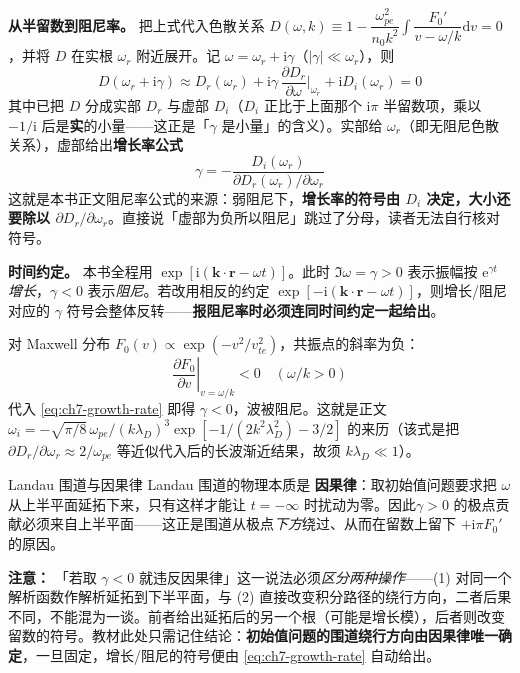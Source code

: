 \documentclass[12pt,a4paper,openany,oneside]{book}
\newcommand{\diff}{\mathrm{d}}
\newcommand{\ii}{\mathrm{i}}
\newcommand{\ee}{\mathrm{e}}
\newcommand{\vect}[1]{\bm{#1}}
\begin{document}
\textbf{从半留数到阻尼率。} 把上式代入色散关系 $D(\omega,k)\equiv 1-\dfrac{\omega_{pe}^2}{n_0k^2}\displaystyle\int\dfrac{F_0'}{v-\omega/k}\diff v=0$，并将 $D$ 在实根 $\omega_r$ 附近展开。记 $\omega=\omega_r+\ii\gamma$（$|\gamma|\ll\omega_r$），则
\[
D(\omega_r+\ii\gamma) \approx D_r(\omega_r) + \ii\gamma\,\frac{\partial D_r}{\partial\omega}\Big|_{\omega_r} + \ii D_i(\omega_r) = 0
\]
其中已把 $D$ 分成实部 $D_r$ 与虚部 $D_i$（$D_i$ 正比于上面那个 $\ii\pi$ 半留数项，乘以 $-1/\ii$ 后是\textbf{实}的小量——这正是「$\gamma$ 是小量」的含义）。实部给 $\omega_r$（即无阻尼色散关系），虚部给出\textbf{增长率公式}
\begin{equation}
\boxed{\;\gamma = -\frac{D_i(\omega_r)}{\partial D_r(\omega_r)/\partial\omega_r}\;}
\label{eq:ch7-growth-rate}
\end{equation}
这就是本书正文阻尼率公式的来源：弱阻尼下，\textbf{增长率的符号由 $D_i$ 决定，大小还要除以 $\partial D_r/\partial\omega_r$}。直接说「虚部为负所以阻尼」跳过了分母，读者无法自行核对符号。

\textbf{时间约定。} 本书全程用 $\exp[\ii(\vect{k}\cdot\vect{r}-\omega t)]$。此时 $\Im\omega=\gamma>0$ 表示振幅按 $\ee^{\gamma t}$ \emph{增长}，$\gamma<0$ 表示\emph{阻尼}。若改用相反的约定 $\exp[-\ii(\vect{k}\cdot\vect{r}-\omega t)]$，则增长/阻尼对应的 $\gamma$ 符号会整体反转——\textbf{报阻尼率时必须连同时间约定一起给出}。

对 Maxwell 分布 $F_0(v)\propto\exp(-v^2/v_{te}^2)$，共振点的斜率为负：
\begin{equation}
\left.\frac{\partial F_0}{\partial v}\right|_{v=\omega/k} < 0 \quad (\omega/k>0)
\label{eq:ch7-landau-condition}
\end{equation}
代入 \eqref{eq:ch7-growth-rate} 即得 $\gamma<0$，波被阻尼。这就是正文 $\omega_i=-\sqrt{\pi/8}\,\omega_{pe}/(k\lambda_D)^3\exp[-1/(2k^2\lambda_D^2)-3/2]$ 的来历（该式是把 $\partial D_r/\partial\omega_r\approx2/\omega_{pe}$ 等近似代入后的长波渐近结果，故须 $k\lambda_D\ll1$）。

\begin{insight}{Landau 围道与因果律}{}
Landau 围道的物理本质是 \textbf{因果律}：取初始值问题要求把 $\omega$ 从上半平面延拓下来，只有这样才能让 $t=-\infty$ 时扰动为零。因此$\gamma>0$ 的极点贡献必须来自上半平面——这正是围道从极点\emph{下方}绕过、从而在留数上留下 $+\ii\pi F_0'$ 的原因。

\textbf{注意：} 「若取 $\gamma<0$ 就违反因果律」这一说法必须\emph{区分两种操作}——(1) 对同一个解析函数作解析延拓到下半平面，与 (2) 直接改变积分路径的绕行方向，二者后果不同，不能混为一谈。前者给出延拓后的另一个根（可能是增长模），后者则改变留数的符号。教材此处只需记住结论：\textbf{初始值问题的围道绕行方向由因果律唯一确定}，一旦固定，增长/阻尼的符号便由 \eqref{eq:ch7-growth-rate} 自动给出。
\end{insight}
\end{document}
